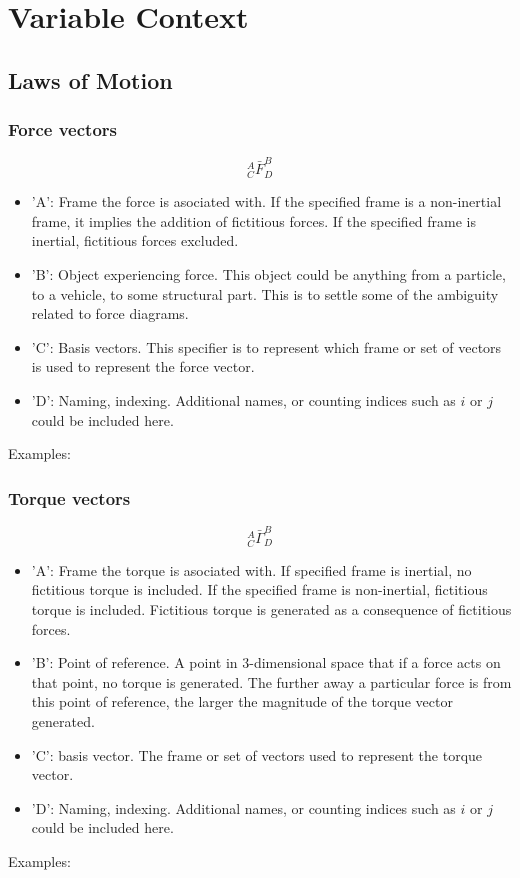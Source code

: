 \section{Variable Context}
\begin{comment}
\end{comment}
\subsection{Laws of Motion}
\begin{comment}
\end{comment}
\subsubsection{Force vectors}
\begin{comment}
\end{comment}
$${}^{A}_{C}\bar{F}^{B}_{D}$$
\begin{itemize}
    \item 'A': Frame the force is asociated with. If the specified frame is a non-inertial frame, it implies the addition of fictitious forces. If the specified frame is inertial, fictitious forces excluded.
    \item 'B': Object experiencing force. This object could be anything from a particle, to a vehicle, to some structural part. This is to settle some of the ambiguity related to force diagrams.
    \item 'C': Basis vectors. This specifier is to represent which frame or set of vectors is used to represent the force vector.
    \item 'D': Naming, indexing. Additional names, or counting indices such as $i$ or $j$ could be included here.
\end{itemize}
Examples:
\subsubsection{Torque vectors}
\begin{comment}
\end{comment}
$${}^{A}_{C}\bar{\Gamma}^{B}_{D}$$
\begin{itemize}
    \item 'A': Frame the torque is asociated with. If specified frame is inertial, no fictitious torque is included. If the specified frame is non-inertial, fictitious torque is included. Fictitious torque is generated as a consequence of fictitious forces.
    \item 'B': Point of reference. A point in $3$-dimensional space that if a force acts on that point, no torque is generated. The further away a particular force is from this point of reference, the larger the magnitude of the torque vector generated.
    \item 'C': basis vector. The frame or set of vectors used to represent the torque vector.
    \item 'D': Naming, indexing. Additional names, or counting indices such as $i$ or $j$ could be included here.
\end{itemize}
Examples:
